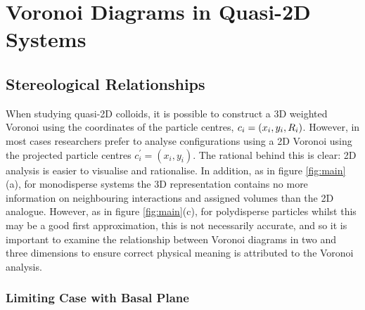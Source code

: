 \section{Voronoi Diagrams in Quasi\--2D Systems}

\subsection{Stereological Relationships}
\label{sec:vorrel}

When studying quasi\--2D colloids, it is possible to construct a 3D weighted Voronoi using the coordinates of the particle centres, $c_i=\left(x_i,y_i,R_i\right)$.
However, in most cases researchers prefer to analyse configurations using a 2D Voronoi using the projected particle centres $c_i^\prime=\left(x_i,y_i\right)$. 
The rational behind this is clear: 2D analysis is easier to visualise and rationalise.
In addition, as in figure \ref{fig:main}(a), for monodisperse systems the 3D representation contains no more information on neighbouring interactions and assigned volumes than the 2D analogue.
However, as in figure \ref{fig:main}(c), for polydisperse particles whilst this may be a good first approximation, this is not necessarily accurate, and so it is important to examine the relationship between Voronoi diagrams in two and three dimensions to ensure correct physical meaning is attributed to the Voronoi analysis.

\subsubsection{Limiting Case with Basal Plane}

